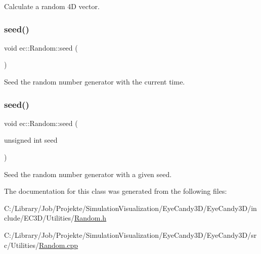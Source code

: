 Calculate a random 4D vector. \mbox{\label{classec_1_1_random_a3e4ad02afb2979b3549fbd70e6f71412}} 
\subsubsection{\texorpdfstring{seed()}{seed()}\hspace{0.1cm}{\footnotesize\ttfamily [1/2]}}
{\footnotesize\ttfamily void ec\+::\+Random\+::seed (\begin{DoxyParamCaption}{ }\end{DoxyParamCaption})\hspace{0.3cm}{\ttfamily [static]}}

Seed the random number generator with the current time. \mbox{\label{classec_1_1_random_aa2b21cb97b3a7c36e89b8afda6ca500d}} 
\subsubsection{\texorpdfstring{seed()}{seed()}\hspace{0.1cm}{\footnotesize\ttfamily [2/2]}}
{\footnotesize\ttfamily void ec\+::\+Random\+::seed (\begin{DoxyParamCaption}\item[{unsigned int}]{seed }\end{DoxyParamCaption})\hspace{0.3cm}{\ttfamily [static]}}

Seed the random number generator with a given seed. 

The documentation for this class was generated from the following files\+:\begin{DoxyCompactItemize}
\item 
C\+:/\+Library/\+Job/\+Projekte/\+Simulation\+Visualization/\+Eye\+Candy3\+D/\+Eye\+Candy3\+D/include/\+E\+C3\+D/\+Utilities/\mbox{\hyperlink{_random_8h}{Random.\+h}}\item 
C\+:/\+Library/\+Job/\+Projekte/\+Simulation\+Visualization/\+Eye\+Candy3\+D/\+Eye\+Candy3\+D/src/\+Utilities/\mbox{\hyperlink{_random_8cpp}{Random.\+cpp}}\end{DoxyCompactItemize}
